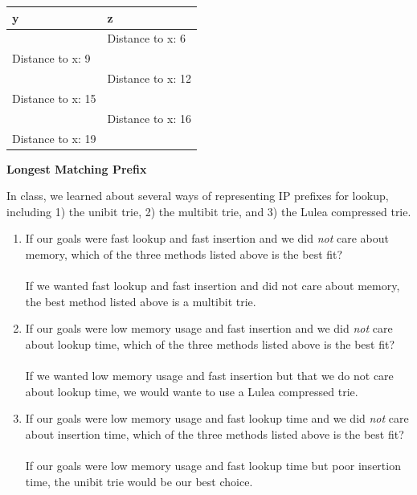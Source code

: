 \documentclass[10pt]{article}
\newenvironment{problem}[2][]{\begin{trivlist}
\item[\hskip \labelsep {\bfseries #1}\hskip \labelsep {\bfseries #2.}]}{\end{trivlist}}
\begin{document}
\begin{problem}{5: Distance-Vector}
\begin{enumerate}[label=(\alph*)]
\begin{table}[ht]
\begin{center}
\begin{tabular}{|p{4cm}|p{4cm}|}
	\hline
	\textbf{y} & \textbf{z}\\
	\hline
	\cellcolor{gray!50} & Distance to x: 6   \\
	\hline
	Distance to x: 9  & \cellcolor{gray!50}\\
	\hline
	\cellcolor{gray!50} & Distance to x: 12   \\
	\hline
	Distance to x: 15   & \cellcolor{gray!50}\\
	\hline
	\cellcolor{gray!50} & Distance to x: 16   \\
	\hline
	Distance to x:  19  & \cellcolor{gray!50}\\
	\hline
	
\end{tabular}
\end{center}
\end{table}
\end{enumerate}
\end{problem}
\newpage
\textbf{Longest Matching Prefix}
\begin{problem}{6: Comparing LPM methods}
In class, we learned about several ways of representing IP prefixes for lookup, including 1) the unibit trie, 2) the multibit trie, and 3) the Lulea compressed trie. 
\begin{enumerate}[label=(\alph*)]
    \item If our goals were fast lookup and fast insertion and we did \emph{not} care about memory, which of the three methods listed above is the best fit? \\\\
    If we wanted fast lookup and fast insertion and did not care about memory, the best method listed above is a multibit trie.
    \item If our goals were low memory usage and fast insertion and we did \emph{not} care about lookup time, which of the three methods listed above is the best fit? \\\\
    If we wanted low memory usage and fast insertion but that we do not care about lookup time, we would wante to use a Lulea compressed trie.
    \item If our goals were low memory usage and fast lookup time and we did \emph{not} care about insertion time, which of the three methods listed above is the best fit? \\\\
    If our goals were low memory usage and fast lookup time but poor insertion time, the unibit trie would be our best choice.
\end{enumerate}
\end{problem}
\end{document}
